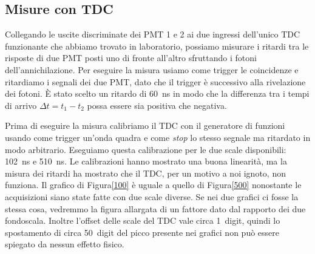 \subsection{Misure con TDC}

Collegando le uscite discriminate dei PMT 1 e 2 ai due ingressi dell'unico TDC funzionante che abbiamo trovato in laboratorio, possiamo misurare i ritardi tra le risposte di due PMT posti uno di fronte all'altro sfruttando i fotoni dell'annichilazione. Per eseguire la misura usiamo come trigger le coincidenze e ritardiamo i segnali dei due PMT, dato che il trigger è successivo alla rivelazione dei fotoni. \`E stato scelto un ritardo di \SI{60}{ns} in modo che la differenza tra i tempi di arrivo $\Delta t=t_1-t_2$ possa essere sia positiva che negativa.

Prima di eseguire la misura calibriamo il TDC con il generatore di funzioni usando come trigger un'onda quadra e come \emph{stop} lo stesso segnale ma ritardato in modo arbitrario.
Eseguiamo questa calibrazione per le due scale disponibili: \SI{102}{ns} e \SI{510}{ns}.
Le calibrazioni hanno mostrato una buona linearità, ma la misura dei ritardi ha mostrato che il TDC, per un motivo a noi ignoto, non funziona.
Il grafico di Figura\autoref{100} è uguale a quello di Figura\autoref{500} nonostante le acquisizioni siano state fatte con due scale diverse. Se nei due grafici ci fosse la stessa cosa, vedremmo la figura allargata di un fattore dato dal rapporto dei due fondoscala. Inoltre l'offset delle scale del TDC vale circa \SI{1}{digit}, quindi lo spostamento di circa \SI{50}{digit} del picco presente nei grafici non può essere spiegato da nessun effetto fisico.

